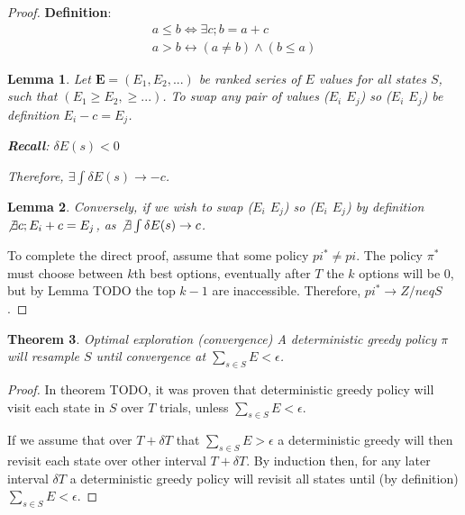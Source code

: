 \documentclass[9pt,twocolumn,twoside]{pnas-new}
\newtheorem{theorem}{Theorem}
\newtheorem{lemma}[theorem]{Lemma}
\begin{document}
\begin{proof}
    \textbf{Definition}: 
    \begin{align}
        a \leq b \Leftrightarrow \exists c; b = a + c \\
        a > b \leftrightarrow (a \neq b) \wedge (b \leq a) 
    \end{align}

    \begin{lemma}
    Let $\textbf{E} = (E_1, E_2, ...)$ be ranked series of $E$ values for all states $S$, such that $(E_1 \geq E_2, \geq ...)$. To swap any pair of values ($E_i$ \geq $E_j$) so ($E_i$ \leq $E_j$) be definition $E_i - c = E_j$.  

    \textbf{Recall}: $\delta E(s) < 0$ 

    Therefore, $\exists \int \delta E(s) \rightarrow -c$. 
    \end{lemma}

    \begin{lemma}
    Conversely, if we wish to swap ($E_i$ \leq $E_j$) so ($E_i$ \geq $E_j$) by definition $\not \exists c; E_i + c = E_j$, as $\not \exists \int \delta E(s) \rightarrow c$. 
    \end{lemma}

    To complete the direct proof, assume that some policy $pi^* \neq pi$. The policy $\pi^*$ must choose between $k$th best options, eventually after $T$ the $k$ options will be 0, but by Lemma TODO the top $k-1$ are inaccessible. Therefore, $pi^* \rightarrow Z /neq S$.
\end{proof}

\begin{theorem}{Optimal exploration (convergence)}
    A deterministic greedy policy $\pi$ will resample $S$ until convergence at $\sum_{s \in S} E < \epsilon$.
\end{theorem}
\begin{proof}
    In theorem TODO, it was proven that deterministic greedy policy will visit each state in $S$ over $T$ trials, unless $\sum_{s \in S} E < \epsilon$. 
    
    If we assume that over $T + \delta T$ that $\sum_{s \in S} E > \epsilon$ a deterministic greedy will then revisit each state over other interval $T + \delta T$. By induction then, for any later interval $\delta T$ a deterministic greedy policy will revisit all states until (by definition) $\sum_{s \in S} E < \epsilon$.
\end{proof}
\end{document}
